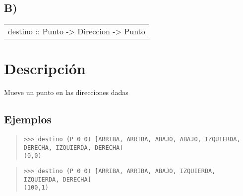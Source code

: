 \subsection{B)}
\begin{haddockdesc}
\item[\begin{tabular}{@{}l}
destino :: Punto -> {\char 91}Direccion{\char 93} -> Punto
\end{tabular}]
{\haddockbegindoc
\section*{Descripción}
Mueve un punto en las direcciones dadas\par
\subsection*{Ejemplos}
\begin{quote}
{\haddockverb\begin{verbatim}
>>> destino (P 0 0) [ARRIBA, ARRIBA, ABAJO, ABAJO, IZQUIERDA, DERECHA, IZQUIERDA, DERECHA]
(0,0)

\end{verbatim}}
\end{quote}
\begin{quote}
{\haddockverb\begin{verbatim}
>>> destino (P 0 0) [ARRIBA, ARRIBA, ABAJO, IZQUIERDA, IZQUIERDA, DERECHA]
(100,1)

\end{verbatim}}
\end{quote}}
\end{haddockdesc}
